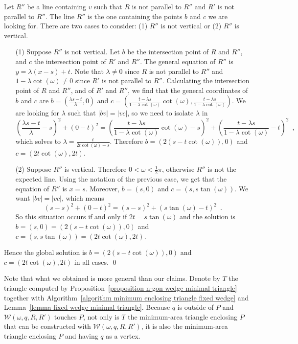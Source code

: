 \documentclass[11pt, oneside]{article}
\def\wedge{\mathcal{W}}
\begin{document}
Let $R''$ be a line containing $v$ such that
$R$ is not parallel to $R''$
and $R'$ is not parallel to $R''$.
The line $R''$ is the one containing the points
$b$ and $c$ we are looking for.
There are two cases to consider:
(1) $R''$ is not vertical
or (2) $R''$ is vertical.

\begin{enumerate}
\item[(1)] Suppose $R''$ is not vertical.
Let $b$ be the intersection point of $R$ and $R''$,
and $c$ the intersection point of $R'$ and $R''$.
The general equation of $R''$ is $y = \lambda (x-s)+t$.
Note that $\lambda\neq 0$ since $R$ is not parallel to $R''$
and $1-\lambda\cot(\omega) \neq 0$ since $R'$ is not parallel to $R''$.
Calculating the intersection point of $R$ and $R''$,
and of $R'$ and $R''$,
we find that the general coordinates of $b$ and $c$ are
$b=\left(\frac{\lambda s-t}{\lambda},0\right)$
and $c = \left(\frac{t-\lambda s}{1-\lambda\cot(\omega)}\cot(\omega),\frac{t-\lambda s}{1-\lambda\cot(\omega)}\right)$.
We are looking for $\lambda$ such that $|bv| = |vc|$,
so we need to isolate $\lambda$ in
$$\left(\frac{\lambda s-t}{\lambda}-s\right)^2+\left(0-t\right)^2 = \left(\frac{t-\lambda s}{1-\lambda\cot(\omega)}\cot(\omega)-s\right)^2+\left(\frac{t-\lambda s}{1-\lambda\cot(\omega)}-t\right)^2 \enspace,$$
which solves to $\lambda = \frac{t}{2t\cot(\omega)-s}$.
Therefore
$b=(2(s-t\cot(\omega)),0)$ and $c=(2t\cot(\omega),2t)$.

\item[(2)] Suppose $R''$ is vertical.
Therefore 
$0<\omega<\frac{1}{2}\pi$,
otherwise $R''$ is not the expected line.
Using the notation of the previous case,
we get that the equation of $R''$ is $x=s$.
Moreover,
$b=(s,0)$ and $c=(s,s\tan(\omega))$.
We want $|bv| = |vc|$,
which means
$$(s-s)^2+(0-t)^2 = (s-s)^2+(s\tan(\omega)-t)^2 \enspace.$$ 
So this situation occurs 
if and only if $2t=s\tan(\omega)$
and the solution is $b=(s,0)=(2(s-t\cot(\omega)),0)$ 
and $c=(s,s\tan(\omega))=(2t\cot(\omega),2t)$.
\end{enumerate}

Hence the global solution is
$b=(2(s-t\cot(\omega)),0)$ 
and $c=(2t\cot(\omega),2t)$
in all cases.
\qed

Note that what we obtained
is more general than our claims.
Denote by $T$ the triangle
computed by Proposition~\ref{proposition n-gon wedge minimal triangle}
together with Algorithm~\ref{algorithm minimum enclosing triangle fixed wedge}
and Lemma~\ref{lemma fixed wedge minimal triangle}.
Because $q$ is outside of $P$
and $\wedge(\omega,q,R,R')$ touches $P$,
not only is $T$ the minimum-area triangle
enclosing $P$ 
that can be constructed with $\wedge(\omega,q,R,R')$,
it is also the minimum-area triangle
enclosing $P$
and having $q$ as a vertex.
\end{document}
